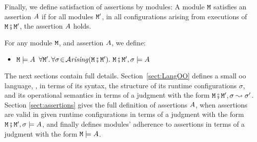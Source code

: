 %
%

Finally, we define satisfaction of assertions by modules: A module $\M$ satisfies an assertion $\A$ if for all modules $\M'$, in all configurations arising from executions of $\M\mkpair\M'$, the assertion $\A$ holds.

\begin{definition}
\label{def:module_satisfies}
For any module $\M$, and  assertion $\A$, we define:
\begin{itemize}
\item
$\M \models \A$ \IFF  $\forall \M'.\, \forall \sigma\!\in\!\Arising{\M\mkpair\M'}.\   \M\mkpair\M', \sigma \models \A$
\end{itemize}
\end{definition}

The next sections contain full details. Section~\ref{sect:LangOO} defines a small oo language,  \LangOO, in terms of its  syntax, the structure of its runtime configurations $\sigma$, and its operational semantics in terms of a judgment with   the form $\M \mkpair \M', \sigma \leadsto \sigma'$. Section \ref{sect:assertions} gives the full definition of assertions $\A$,   when assertions are valid in given runtime configurations in terms of a judgment with   the form $\M \mkpair \M', \sigma \models \A$, and finally defines modules' adherence to assertions  in terms of a judgment with   the form $\M \models \A$.



